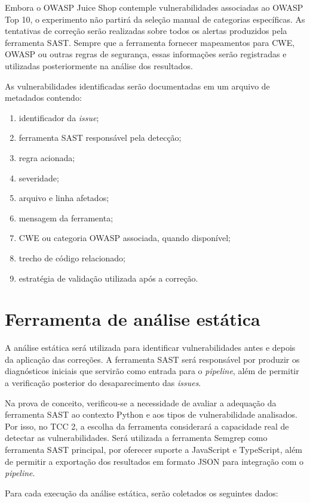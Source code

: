 Embora o OWASP Juice Shop contemple vulnerabilidades associadas ao OWASP Top 10, o experimento não partirá da seleção manual de categorias específicas. As tentativas de correção serão realizadas sobre todos os alertas produzidos pela ferramenta SAST. Sempre que a ferramenta fornecer mapeamentos para CWE, OWASP ou outras regras de segurança, essas informações serão registradas e utilizadas posteriormente na análise dos resultados.

As vulnerabilidades identificadas serão documentadas em um arquivo de metadados contendo:

\begin{enumerate}
\item identificador da \textit{issue};
\item ferramenta SAST responsável pela detecção;
\item regra acionada;
\item severidade;
\item arquivo e linha afetados;
\item mensagem da ferramenta;
\item CWE ou categoria OWASP associada, quando disponível;
\item trecho de código relacionado;
\item estratégia de validação utilizada após a correção.
\end{enumerate}


\section{Ferramenta de análise estática}

A análise estática será utilizada para identificar vulnerabilidades antes e depois da aplicação das correções. A ferramenta SAST será responsável por produzir os diagnósticos iniciais que servirão como entrada para o \textit{pipeline}, além de permitir a verificação posterior do desaparecimento das \textit{issues}.

Na prova de conceito, verificou-se a necessidade de avaliar a adequação da ferramenta SAST ao contexto Python e aos tipos de vulnerabilidade analisados. Por isso, no TCC 2, a escolha da ferramenta considerará a capacidade real de detectar as vulnerabilidades. Será utilizada a ferramenta Semgrep como ferramenta SAST principal, por oferecer suporte a JavaScript e TypeScript, além de permitir a exportação dos resultados em formato JSON para integração com o \textit{pipeline}.

Para cada execução da análise estática, serão coletados os seguintes dados:

